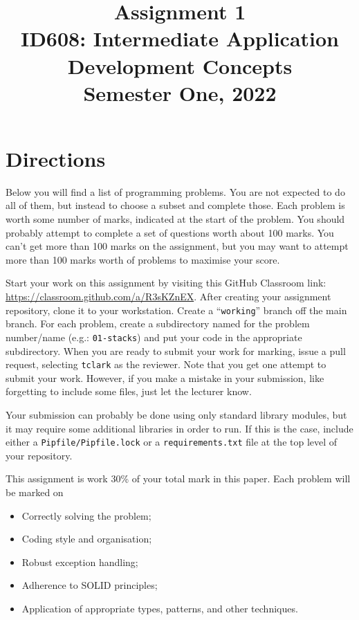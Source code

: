 \documentclass{article}
\begin{document}
\title{Assignment 1\\ID608: Intermediate Application Development Concepts \\Semester One, 2022}
\date{}
\maketitle

\section*{Directions}
Below you will find a list of programming problems. You are not expected to do all of them, but instead to choose a subset and complete those. Each problem is worth some number of marks, indicated at the start of the problem. You should probably attempt to complete a set of questions worth about 100 marks. You can't get more than 100 marks on the assignment, but you may want to attempt more than 100 marks worth of problems to maximise your score.


Start your work on this assignment by visiting this GitHub Classroom link: \url{https://classroom.github.com/a/R3sKZnEX}. After creating your assignment repository, clone it to your workstation.  Create a ``\texttt{working}'' branch off the main branch. For each problem, create a subdirectory named for the problem number/name (e.g.: \texttt{01-stacks}) and put your code in the appropriate subdirectory. When you are ready to submit your work for marking, issue a pull request, selecting \texttt{tclark} as the reviewer. Note that you get one attempt to submit your work. However, if you make a mistake in your submission, like forgetting to include some files, just let the lecturer know.


Your submission can probably be done using only standard library modules, but it may require some additional libraries in order to run. If this is the case, include either a \texttt{Pipfile/Pipfile.lock} or a \texttt{requirements.txt} file at the top level of your repository. 

This assignment is work 30\% of your total mark in this paper. Each problem will be marked on 
\begin{itemize}
  \item Correctly solving the problem;
  \item Coding style and organisation;
  \item Robust exception handling;
  \item Adherence to SOLID principles;
  \item Application of appropriate types, patterns, and other techniques.
\end{itemize}  
\end{document}
